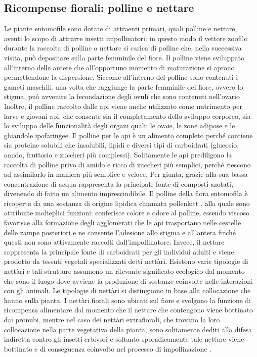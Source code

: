 \documentclass[main.tex]{subfiles}
\begin{document}
\subsection{Ricompense fiorali: polline e nettare}\label{Cap. 1.7}

Le piante entomofile sono dotate di attraenti primari, quali polline e nettare, aventi lo scopo di attrarre insetti impollinatori: in questo modo il vettore zoofilo durante la raccolta di polline o nettare si carica di polline che, nella successiva visita, può depositare sulla parte femminile del fiore. Il polline viene sviluppato all’interno delle antere che all’opportuno momento di maturazione si aprono permettendone la dispersione. Siccome all’interno del polline sono contenuti i gameti maschili, una volta che raggiunge la parte femminile del fiore, ovvero lo stigma, può avvenire la fecondazione degli ovuli che sono contenuti nell’ovario \citep{alt}. Inoltre, il polline raccolto dalle api viene anche utilizzato come nutrimento per larve e giovani api, che consente sia il completamento dello sviluppo corporeo, sia lo sviluppo delle funzionalità degli organi quali: le ovaie, le zone adipose e le ghiandole ipofaringee.
Il polline per le api è un alimento completo perché contiene sia proteine solubili che insolubili, lipidi e diversi tipi di carboidrati (glucosio, amido, fruttosio e zuccheri più complessi). Solitamente le api prediligono la raccolta di polline privo di amido e ricco di zuccheri più semplici, perché riescono ad assimilarlo in maniera più semplice e veloce. Per giunta, grazie alla sua bassa concentrazione di acqua rappresenta la principale fonte di composti azotati, divenendo di fatto un alimento imprescindibile.
Il polline della flora entomofila è ricoperto da una sostanza di origine lipidica chiamata pollenkitt \citep{bellu}, alla quale sono attribuite molteplici funzioni: conferisce colore e odore al polline, essendo viscoso favorisce alla formazione degli agglomerati che le api trasportano nelle cestelle delle zampe posteriori e ne consente l’adesione allo stigma e all’antera finché questi non sono attivamente raccolti dall’impollinatore.
Invece, il nettare rappresenta la principale fonte di carboidrati per gli individui adulti e viene prodotto da tessuti vegetali specializzati detti nettàri. Esistono varie tipologie di nettàri e tali strutture assumono un rilevante significato ecologico dal momento che sono il luogo dove avviene la produzione di sostanze coinvolte nelle interazioni con gli animali.
Le tipologie di nettàri si distinguono in base alla collocazione che hanno sulla pianta. I nettàri fiorali sono ubicati sul fiore e svolgono la funzione di ricompensa alimentare dal momento che il nettare che contengono viene bottinato dai pronubi, mentre nel caso dei nettàri extrafiorali, che trovano la loro collocazione nella parte vegetativa della pianta, sono solitamente dediti alla difesa indiretta contro gli insetti erbivori e soltanto sporadicamente tale nettare viene bottinato e di conseguenza coinvolto nel processo di impollinazione \citep{bellu}.
\end{document}
